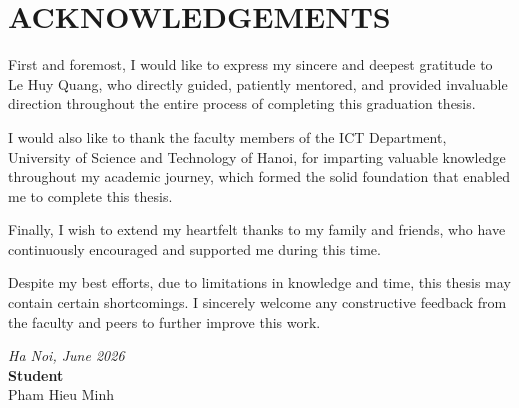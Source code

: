 
\chapter*{ACKNOWLEDGEMENTS}

First and foremost, I would like to express my sincere and deepest gratitude to Le Huy Quang, who directly guided, patiently mentored, and provided invaluable direction throughout the entire process of completing this graduation thesis.

I would also like to thank the faculty members of the ICT Department, University of Science and Technology of Hanoi, for imparting valuable knowledge throughout my academic journey, which formed the solid foundation that enabled me to complete this thesis.

Finally, I wish to extend my heartfelt thanks to my family and friends, who have continuously encouraged and supported me during this time.

Despite my best efforts, due to limitations in knowledge and time, this thesis may contain certain shortcomings. I sincerely welcome any constructive feedback from the faculty and peers to further improve this work.

\vspace{1.5cm}

\begin{flushright}
\textit{Ha Noi, June 2026}\\[1cm]
\textbf{Student}\\[1.2cm]
Pham Hieu Minh
\end{flushright}
